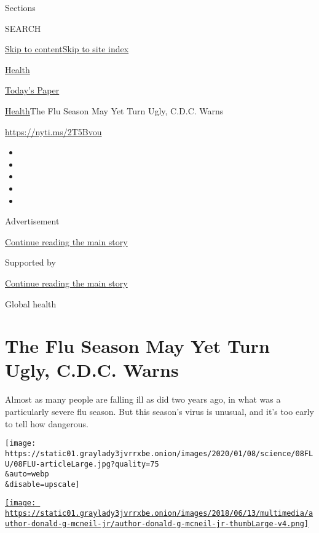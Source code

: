 Sections

SEARCH

\protect\hyperlink{site-content}{Skip to
content}\protect\hyperlink{site-index}{Skip to site index}

\href{https://www.nytimes3xbfgragh.onion/section/health}{Health}

\href{https://myaccount.nytimes3xbfgragh.onion/auth/login?response_type=cookie\&client_id=vi}{}

\href{https://www.nytimes3xbfgragh.onion/section/todayspaper}{Today's
Paper}

\href{/section/health}{Health}\textbar{}The Flu Season May Yet Turn
Ugly, C.D.C. Warns

\url{https://nyti.ms/2T5Bvou}

\begin{itemize}
\item
\item
\item
\item
\item
\end{itemize}

Advertisement

\protect\hyperlink{after-top}{Continue reading the main story}

Supported by

\protect\hyperlink{after-sponsor}{Continue reading the main story}

Global health

\hypertarget{the-flu-season-may-yet-turn-ugly-cdc-warns}{%
\section{The Flu Season May Yet Turn Ugly, C.D.C.
Warns}\label{the-flu-season-may-yet-turn-ugly-cdc-warns}}

Almost as many people are falling ill as did two years ago, in what was
a particularly severe flu season. But this season's virus is unusual,
and it's too early to tell how dangerous.

\texttt{[image: https://static01.graylady3jvrrxbe.onion/images/2020/01/08/science/08FLU/08FLU-articleLarge.jpg?quality=75\\\&auto=webp\\\&disable=upscale]}

\href{https://www.nytimes3xbfgragh.onion/by/donald-g-mcneil-jr}{\texttt{[image: https://static01.graylady3jvrrxbe.onion/images/2018/06/13/multimedia/author-donald-g-mcneil-jr/author-donald-g-mcneil-jr-thumbLarge-v4.png]}}

